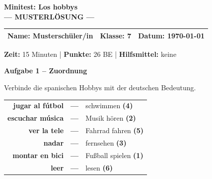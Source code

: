 \documentclass[11pt, a4paper]{article}
\newcommand{\fachfarbe}{spanisch}
\newcommand{\thema}{Minitest: Los hobbys}
\newcommand{\klasse}{7}
\newcommand{\maxpunkte}{26}
\newcommand{\zeit}{15 Minuten}
\newcommand{\datum}{\today}
\newcommand{\punktebox}[1]{\hfill\fbox{\small \_/#1}}
\newcommand{\lsg}[1]{\textcolor{loesung}{\textbf{#1}}}
\newenvironment{aufgabe}[1]{%
    \needspace{5\baselineskip}%
    \nopagebreak[4]%
    \vspace{10pt}
    \noindent\textbf{\textcolor{\fachfarbe}{Aufgabe #1}}
    \nopagebreak[4]%
    \vspace{5pt}
    \nopagebreak[4]%
    \begin{list}{}{\leftmargin=0pt}
    \item[]
}{%
    \end{list}
}
\newcommand{\es}[1]{\textcolor{\fachfarbe}{\textbf{#1}}}
\begin{document}

\begin{center}
    {\Large\bfseries\textcolor{\fachfarbe}{\thema}}\\[0.3em]
    {\large\textcolor{loesung}{\textbf{--- MUSTERLÖSUNG ---}}}
\end{center}

\vspace{5pt}

\noindent
\begin{tabularx}{\textwidth}{|X|X|X|}
\hline
\textbf{Name:} \lsg{Musterschüler/in} &
\textbf{Klasse:} \klasse &
\textbf{Datum:} \datum \\
\hline
\end{tabularx}

\vspace{10pt}

\begin{infobox}
\textbf{Zeit:} \zeit{} | \textbf{Punkte:} \maxpunkte{} BE | \textbf{Hilfsmittel:} keine
\end{infobox}

\vspace{15pt}


\begin{aufgabe}{1 -- Zuordnung}
Verbinde die spanischen Hobbys mit der deutschen Bedeutung. \punktebox{6}
\end{aufgabe}

\begin{center}
\begin{tabular}{rcl}
\es{jugar al fútbol} & \lsg{---} & schwimmen \lsg{(4)} \\[0.8em]
\es{escuchar música} & \lsg{---} & Musik hören \lsg{(2)} \\[0.8em]
\es{ver la tele} & \lsg{---} & Fahrrad fahren \lsg{(5)} \\[0.8em]
\es{nadar} & \lsg{---} & fernsehen \lsg{(3)} \\[0.8em]
\es{montar en bici} & \lsg{---} & Fußball spielen \lsg{(1)} \\[0.8em]
\es{leer} & \lsg{---} & lesen \lsg{(6)} \\
\end{tabular}
\end{center}
\end{document}
